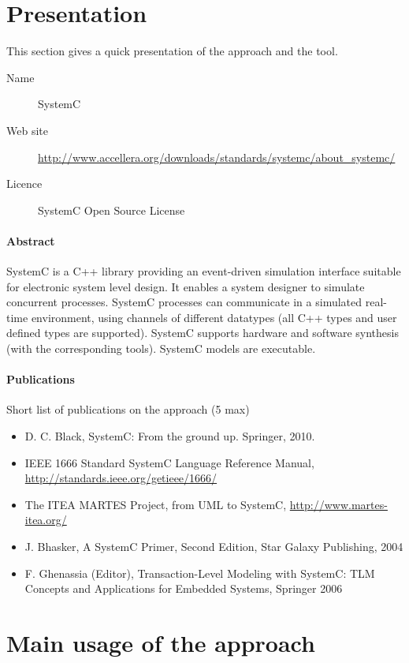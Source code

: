 \section{Presentation}

This section gives a quick presentation of the approach and the tool.

\begin{description}
\item[Name] SystemC
\item[Web site] \url{http://www.accellera.org/downloads/standards/systemc/about_systemc/}
\item[Licence] SystemC Open Source License
\end{description}

\paragraph{Abstract} 

SystemC is a C++ library providing an event-driven simulation interface suitable for electronic system level design. It enables a system designer to simulate concurrent processes. SystemC processes can communicate in a simulated real-time environment, using channels of different datatypes (all C++ types and user defined types are supported). SystemC supports hardware and software synthesis (with the corresponding tools). SystemC models are executable.


\paragraph{Publications} Short list of publications on the approach (5 max)

\begin{itemize}
\item D. C. Black, SystemC: From the ground up. Springer, 2010.
\item IEEE 1666 Standard SystemC Language Reference Manual, \url{http://standards.ieee.org/getieee/1666/}
\item The ITEA MARTES Project, from UML to SystemC, \url{http://www.martes-itea.org/}
\item J. Bhasker, A SystemC Primer, Second Edition, Star Galaxy Publishing, 2004
\item F. Ghenassia (Editor), Transaction-Level Modeling with SystemC: TLM Concepts and Applications for Embedded Systems, Springer 2006
\end{itemize}

\section{Main usage of the approach}
\label{main_usage}

